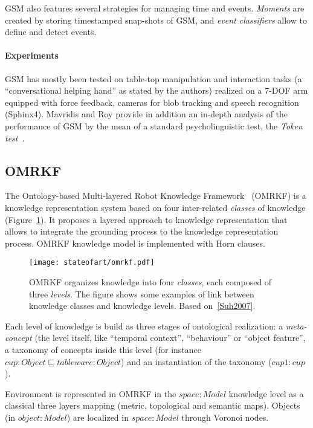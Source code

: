 GSM also features several strategies for managing time and events.
\emph{Moments} are created by storing timestamped snap-shots of GSM, and
\emph{event classifiers} allow to define and detect events.

\paragraph{Experiments} GSM has mostly been tested on table-top manipulation
and interaction tasks (a ``conversational helping hand'' as stated by the
authors) realized on a 7-DOF arm equipped with force feedback, cameras for blob
tracking and speech recognition (Sphinx4). Mavridis and Roy provide in addition
an in-depth analysis of the performance of GSM by the mean of a standard
psycholinguistic test, the \emph{Token test}~\cite{DiSimoni1978}.

\subsection{OMRKF}
\label{sect|omrkf}

The Ontology-based Multi-layered Robot Knowledge Framework~\cite{Suh2007}
(OMRKF) is a knowledge representation system based on four inter-related
\emph{classes} of knowledge (Figure~\ref{fig|omrkf}). It proposes a layered
approach to knowledge representation that allows to integrate the grounding
process to the knowledge representation process. OMRKF knowledge model is
implemented with Horn clauses.

\begin{figure}
    \centering
    \texttt{[image: stateofart/omrkf.pdf]}

    \caption{OMRKF organizes knowledge into four \emph{classes}, each composed
    of three \emph{levels}. The figure shows some examples of link between
    knowledge classes and knowledge levels. Based on~\ref{Suh2007}.}

    \label{fig|omrkf}
\end{figure}

Each level of knowledge is build as three stages of ontological realization: a
\emph{meta-concept} (the level itself, like ``temporal context'', ``behaviour''
or ``object feature'', a taxonomy of concepts inside this level (for instance
$cup : Object \sqsubseteq tableware : Object$) and an instantiation of the
taxonomy ($cup1 : cup$).

Environment is represented in OMRKF in the $space : Model$ knowledge level as a
classical three layers mapping (metric, topological and semantic maps). Objects
(in $object : Model$) are localized in $space : Model$ through Voronoi nodes.

